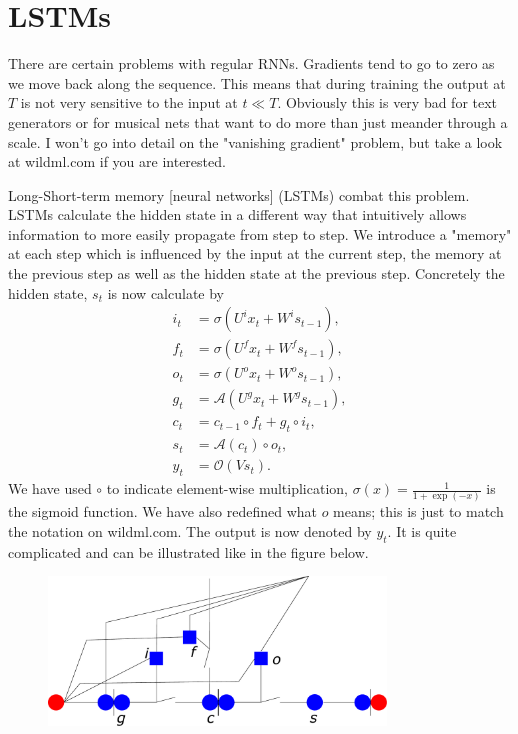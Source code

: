 \documentclass[12pt]{article}
\numberwithin{equation}{section}
\begin{document}
\section{LSTMs}
There are certain problems with regular RNNs. Gradients tend to go to zero as we move back along the sequence. This means that during training the output at \(T\) is not very sensitive to the input at \(t\ll T\). Obviously this is very bad for text generators or for musical nets that want to do more than just meander through a scale. I won't go into detail on the "vanishing gradient" problem, but take a look at wildml.com if you are interested.

Long-Short-term memory [neural networks] (LSTMs) combat this problem. LSTMs calculate the hidden state in a different way that intuitively allows information to more easily propagate from step to step. We introduce a "memory" at each step which is influenced by the input at the current step, the memory at the previous step as well as the hidden state at the previous step. Concretely the hidden state, \(s_t\) is now calculate by
\begin{align}
i_t &= \sigma(U^ix_t + W^is_{t-1}), \\
f_t &= \sigma(U^fx_t + W^f s_{t-1}), \\
o_t &= \sigma(U^o x_t + W^o s_{t-1}), \\
g_t &= \mathcal{A}(U^g x_t + W^gs_{t-1}), \\
c_t &= c_{t-1} \circ f_t + g_t \circ i_t, \\
s_t &= \mathcal{A}(c_t) \circ o_t,\\
y_t &= \mathcal{O}(Vs_t).
\end{align}
We have used \(\circ\) to indicate element-wise multiplication, \(\sigma(x) = \frac{1}{1+\exp(-x)}\) is the sigmoid function. We have also redefined what \(o\) means; this is just to match the notation on wildml.com. The output is now denoted by \(y_t\). It is quite complicated and can be illustrated like in the figure below.

\begin{figure}[H]
\centering
\includegraphics[width=0.8\textwidth]{LSTMBasicUnit.pdf}
\caption{}
\end{figure}
\end{document}
